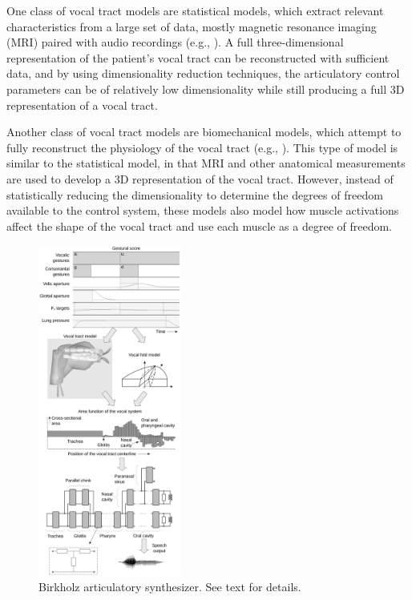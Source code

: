 \documentclass{article}
\begin{document}
One class of vocal tract models
are statistical models,
which extract relevant characteristics
from a large set of data,
mostly magnetic resonance imaging (MRI)
paired with audio recordings
(e.g., \citealp{badin2002}).
A full three-dimensional representation
of the patient's vocal tract
can be reconstructed with sufficient data,
and by using dimensionality reduction techniques,
the articulatory control parameters
can be of relatively low dimensionality
while still producing a full
3D representation of a vocal tract.

Another class of vocal tract models
are biomechanical models,
which attempt to fully reconstruct
the physiology of the vocal tract
(e.g., \citealp{dang2004}).
This type of model is similar
to the statistical model,
in that MRI and other anatomical measurements
are used to develop a 3D representation
of the vocal tract.
However, instead of statistically
reducing the dimensionality
to determine the degrees of freedom
available to the control system,
these models also model how
muscle activations affect the shape
of the vocal tract
and use each muscle
as a degree of freedom.

\begin{figure}
  \vspace{-30pt}
  \begin{center}
    \includegraphics[width=0.42\textwidth]{birkholz}
  \end{center}
  \vspace{-12pt}
  \caption{Birkholz articulatory synthesizer.
    See text for details.}
  \label{fig:birkholz}
  \vspace{-20pt}
\end{figure}
\end{document}
